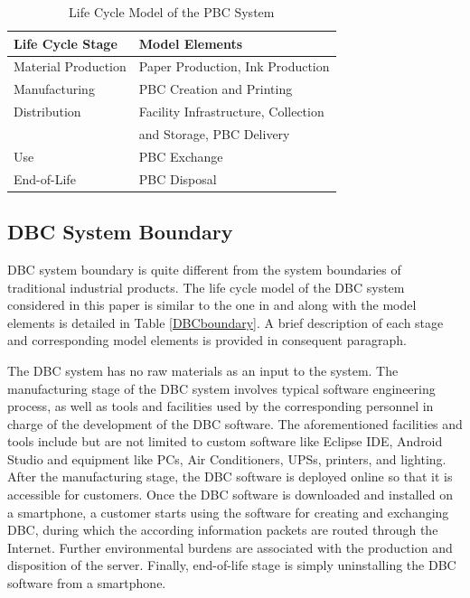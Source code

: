 \documentclass[conference]{IEEEtran}
\begin{document}
\begin{table}[h]
\caption{Life Cycle Model of the PBC System}
\centering
\begin{tabular}{|l|l|}
\hline
\textbf{Life Cycle Stage} & \textbf{Model Elements}           \\ \hline
Material Production       & Paper Production, Ink Production \\ \hline
Manufacturing             & PBC Creation and Printing        \\ \hline
Distribution              & Facility Infrastructure, Collection \\
& and Storage, PBC Delivery \\ \hline
Use                       & PBC Exchange                     \\ \hline
End-of-Life               & PBC Disposal                     \\ \hline
\end{tabular}
\label{PBCboundary}
\end{table}




\subsection{DBC System Boundary}\label{DBCBoundary}

DBC system boundary is quite different from the system boundaries of traditional industrial products. The life cycle model of the DBC system considered in this paper is similar to the one in \cite{Moshnyaga:2013, moshnyaga2013assessment} and along with the model elements is detailed in Table \ref{DBCboundary}. A brief description of each stage and corresponding model elements is provided in consequent paragraph.

The DBC system has no raw materials as an input to the system. The manufacturing stage of the DBC system involves typical software engineering process, as well as tools and facilities used by the corresponding personnel in charge of the development of the DBC software. The aforementioned facilities and tools include but are not limited to custom software like Eclipse IDE, Android Studio and equipment like PCs, Air Conditioners, UPSs, printers, and lighting. After the manufacturing stage, the DBC software is deployed online so that it is accessible for customers. Once the DBC software is downloaded and installed on a smartphone, a customer starts using the software for creating and exchanging DBC, during which the according information packets are routed through the Internet. Further environmental burdens are associated with the production and disposition of the server. Finally, end-of-life stage is simply uninstalling the DBC software from a smartphone. 
\end{document}
